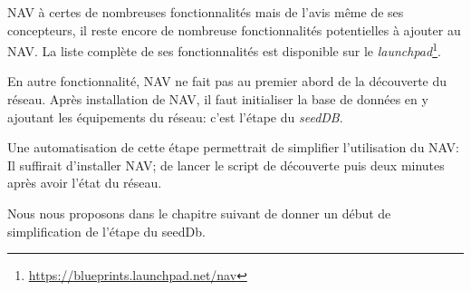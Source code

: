 NAV à certes de nombreuses fonctionnalités mais de l'avis même de ses concepteurs, il reste encore de nombreuse fonctionnalités potentielles à ajouter au NAV. La liste complète de ses fonctionnalités est disponible sur le \emph{launchpad}\footnote{\url{https://blueprints.launchpad.net/nav}}.

En autre fonctionnalité, NAV ne fait pas au premier abord de la découverte du réseau. Après installation de NAV, il faut initialiser la base de données en y ajoutant les équipements du réseau: c'est l'étape du \emph{seedDB}.

Une automatisation de cette étape permettrait de simplifier l'utilisation du NAV: Il suffirait d'installer NAV; de lancer le script de découverte puis deux minutes après avoir l'état du réseau.

Nous nous proposons dans le chapitre suivant de donner un début de simplification de l'étape du seedDb.